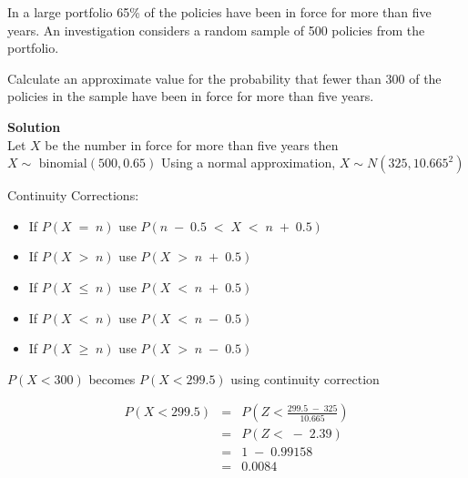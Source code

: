 \documentclass[a4paper,12pt]{article}
\begin{document}
\large
\noindent In a large portfolio 65\% of the policies have been in force for more than five years. An investigation considers a random sample of 500 policies from the portfolio.


 \large
\noindent Calculate an approximate value for the probability that fewer than 300 of the policies in the sample have been in force for more than five years.
\medskip

\noindent \textbf{Solution}\\
Let $X$ be the number in force for more than five years
then $X \sim \mbox{ binomial}(500,0.65)$
Using a normal approximation, $X \sim N(325, 10.665^2 )$
\begin{framed}
\noindent Continuity Corrections:
\begin{itemize}
\item If ${ \displaystyle P(X \;=\;n) }$ use ${ \displaystyle P(n\;-\;0.5 \;<\; X \;<\;n\;+\;0.5) }$
\item If ${ \displaystyle P(X \;>\;n) }$ use ${ \displaystyle P(X \;>\;n\;+\;0.5) }$
\item If ${ \displaystyle P(X \;\leq\;n) }$ use ${ \displaystyle P(X \;<\;n\;+\;0.5) }$
\item If ${ \displaystyle P(X \;<\;n) }$ use  ${ \displaystyle P(X \;<\;n\;-\;0.5) }$
\item If ${ \displaystyle P(X \;\geq\;n) }$ use $ { \displaystyle P(X \;>\;n \;-\; 0.5) }$
\end{itemize}
\end{framed}
$P(X < 300)$ becomes $P(X < 299.5)$ using continuity correction

\begin{eqnarray*} 
P(X < 299.5) &=& P \left( Z < \frac{299.5 \;-\; 325}{10.665} \right)\\
&=& P ( Z < \;-\; 2.39)\\
&=& 1 \;-\; 0.99158 \\ 
&=& 0.0084\\
\end{eqnarray*}


\end{document}
